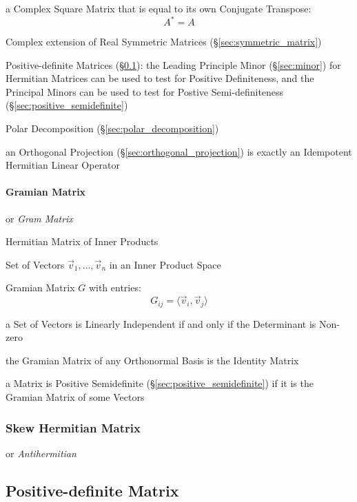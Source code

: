 a Complex Square Matrix that is equal to its own Conjugate Transpose:
\[
  A^* = A
\]

Complex extension of Real Symmetric Matrices (\S\ref{sec:symmetric_matrix})

Positive-definite Matrices (\S\ref{sec:positive_definite}): the Leading
Principle Minor (\S\ref{sec:minor}) for Hermitian Matrices can be used to test
for Positive Definiteness, and the Principal Minors can be used to test for
Postive Semi-definiteness (\S\ref{sec:positive_semidefinite})

Polar Decomposition (\S\ref{sec:polar_decomposition})

an Orthogonal Projection (\S\ref{sec:orthogonal_projection}) is exactly an
Idempotent Hermitian Linear Operator



\paragraph{Gramian Matrix}\label{sec:gramian_matrix}\hfill

or \emph{Gram Matrix}

Hermitian Matrix of Inner Products

Set of Vectors $\vec{v}_1,\ldots,\vec{v}_n$ in an Inner Product Space

Gramian Matrix $G$ with entries:
\[
  G_{ij} = \langle{\vec{v}_i,\vec{v}_j}\rangle
\]

a Set of Vectors is Linearly Independent if and only if the Determinant is
Non-zero

the Gramian Matrix of any Orthonormal Basis is the Identity Matrix

a Matrix is Positive Semidefinite (\S\ref{sec:positive_semidefinite}) if it is
the Gramian Matrix of some Vectors



\subsubsection{Skew Hermitian Matrix}\label{sec:skew_hermitian}

or \emph{Antihermitian}



\subsection{Positive-definite Matrix}\label{sec:positive_definite}


